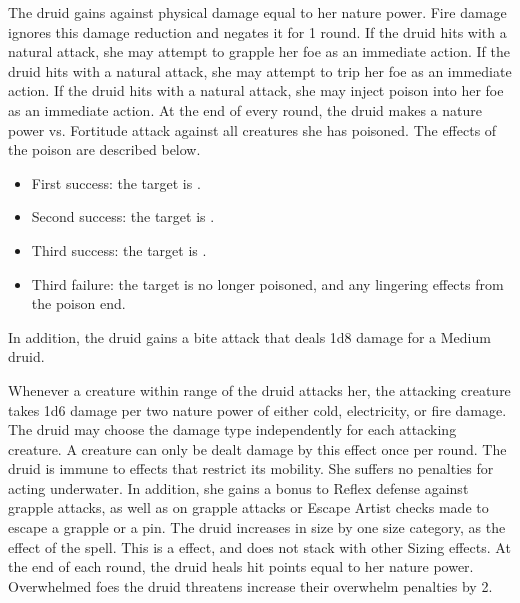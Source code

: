          The druid gains  against physical damage equal to her nature power.
        Fire damage ignores this damage reduction and negates it for 1 round.
        If the druid hits with a natural attack, she may attempt to grapple her foe as an immediate action.
        If the druid hits with a natural attack, she may attempt to trip her foe as an immediate action.
        If the druid hits with a natural attack, she may inject poison into her foe as an immediate action.
        At the end of every round, the druid makes a nature power vs. Fortitude attack against all creatures she has poisoned.
        The effects of the poison are described below.
        \begin{itemize}
            \item First success: the target is \sickened.
            \item Second success: the target is \staggered.
            \item Third success: the target is \nauseated.
            \item Third failure: the target is no longer poisoned, and any lingering effects from the poison end.
        \end{itemize}
        \par In addition, the druid gains a bite attack that deals 1d8 damage for a Medium druid.

        Whenever a creature within \rngmed range of the druid attacks her, the attacking creature takes 1d6 damage per two nature power of either cold, electricity, or fire damage.
        The druid may choose the damage type independently for each attacking creature.
        A creature can only be dealt damage by this effect once per round.
         The druid is immune to effects that restrict its mobility. She suffers no penalties for acting underwater. In addition, she gains a  bonus to Reflex defense against grapple attacks, as well as on grapple attacks or Escape Artist checks made to escape a grapple or a pin.
        The druid increases in size by one size category, as the effect of the  spell.
        This is a  effect, and does not stack with other Sizing effects.
        At the end of each round, the druid heals hit points equal to her nature power.
        Overwhelmed foes the druid threatens increase their overwhelm penalties by 2.

